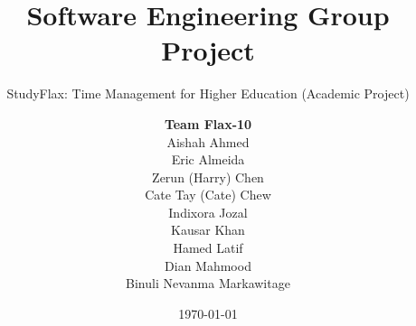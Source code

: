 \documentclass[a4paper, 12pt]{report}
\title{Software Engineering Group Project}
\subtitle{StudyFlax: Time Management for Higher Education (Academic Project)}
\author{\textbf{Team Flax-10}\\
Aishah Ahmed\\
Eric Almeida\\
Zerun (Harry) Chen\\
Cate Tay (Cate) Chew\\
Indixora Jozal\\
Kausar Khan\\
Hamed Latif\\
Dian Mahmood\\
Binuli Nevanma Markawitage
}
\date{\today}
\begin{document}
    \maketitle
    \romantableofcontents

    
    
    
    
    

    \appendix
\end{document}
